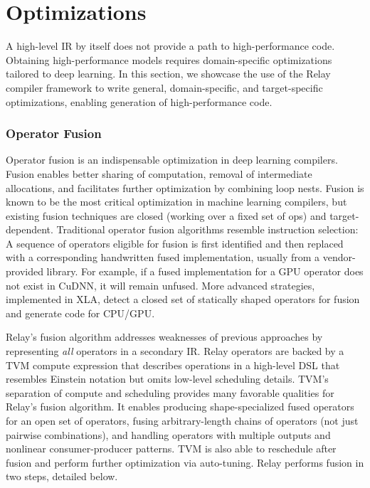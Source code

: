 \chapter{Optimizations}
\label{ch:optimizations}


A high-level IR by itself does not provide a path to high-performance code.
Obtaining high-performance models requires domain-specific
  optimizations tailored to deep learning.
In this section, we showcase the use of the Relay compiler framework
  to write general, domain-specific, and target-specific optimizations,
  enabling generation of high-performance code.

\subsection{Operator Fusion}
\label{sec:fusion}

Operator fusion is an indispensable optimization in deep learning compilers.
Fusion enables better sharing of computation, removal of
  intermediate allocations, and facilitates further optimization by
  combining loop nests.
Fusion is known to be the most critical optimization in machine
  learning compilers, but existing fusion techniques
  are closed (working over a fixed set of ops)
  and target-dependent.
Traditional operator fusion algorithms resemble instruction
  selection:
A sequence of operators eligible
  for fusion is first identified and then replaced with a corresponding
  handwritten fused implementation, usually from a vendor-provided library.
For example, if a fused implementation for a GPU operator does not exist in CuDNN,
  it will remain unfused.
More advanced strategies, implemented in XLA, detect a
  closed set of statically shaped operators for fusion and
  generate code for CPU/GPU.

Relay's fusion algorithm addresses weaknesses of previous approaches by representing
  \textit{all} operators in a secondary IR.
Relay operators are backed by a TVM compute expression that
  describes operations in a high-level DSL that resembles Einstein notation
  but omits low-level scheduling details.
TVM's separation of compute and scheduling provides many favorable qualities
  for Relay's fusion algorithm.
It enables producing shape-specialized fused operators for an open set of operators,
  fusing arbitrary-length chains of operators (not just pairwise combinations),
  and handling operators with multiple outputs and nonlinear consumer-producer patterns.
TVM is also able to reschedule after fusion and perform further optimization via auto-tuning.
Relay performs fusion in two steps, detailed below.

